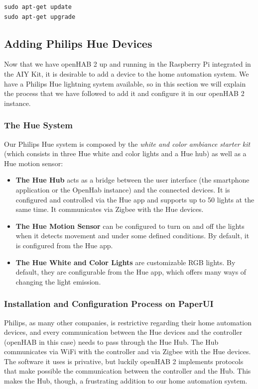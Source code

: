 \begin{lstlisting}[style=Consola]
sudo apt-get update
sudo apt-get upgrade
\end{lstlisting}

\subsection{Adding Philips Hue Devices}
Now that we have openHAB 2 up and running in the Raspberry Pi integrated in the AIY Kit, it is desirable to add a device to the home
automation system. We have a Philips Hue lightning system available, so in this section we will explain the process that we have
followed to add it and configure it in our openHAB 2 instance.

\subsubsection{The Hue System}
Our Philips Hue system is composed by the \textit{white and color ambiance starter kit}\cite{philipsHueMeethue} (which consists
in three Hue white and color lights and a Hue hub) as well as a Hue motion sensor:

\begin{itemize}
    \item \textbf{The Hue Hub} acts as a bridge between the user interface (the smartphone application or the OpenHab instance) and
    the connected devices. It is configured and controlled via the Hue app and supports up to 50 lights at the same time. It communicates
    via Zigbee with the Hue devices.
    \item \textbf{The Hue Motion Sensor} can be configured to turn on and off the lights when it detects movement and under some
    defined conditions. By default, it is configured from the Hue app.
    \item \textbf{The Hue White and Color Lights} are customizable RGB lights. By default, they are configurable from the Hue app,
    which offers many ways of changing the light emission.
\end{itemize}

\subsubsection{Installation and Configuration Process on PaperUI}
Philips, as many other companies, is restrictive regarding their home automation devices, and every communication between the Hue
devices and the controller (openHAB in this case) needs to pass through the Hue Hub. The Hub communicates via WiFi with the controller
and via Zigbee with the Hue devices. The software it uses is privative, but luckily openHAB 2 implements protocols that make possible
the communication between the controller and the Hub. This makes the Hub, though, a frustrating addition to our home automation system.

